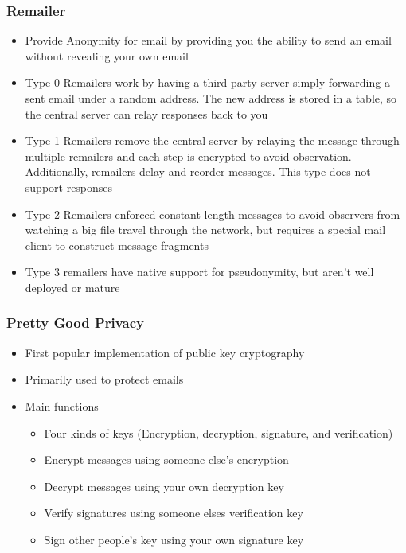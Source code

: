 \documentclass[twoside]{article}
\begin{document}
\subsubsection{Remailer}
\begin{itemize}
\item Provide Anonymity for email by providing you the ability to send an email without revealing your own email
\item Type 0 Remailers work by having a third party server simply forwarding a sent email under a random address. The new address is stored in a table, so the central server can relay responses back to you 
\item Type 1 Remailers remove the central server by relaying the message through multiple remailers and each step is encrypted to avoid observation. Additionally, remailers delay and reorder messages. This type does not support responses
\item Type 2 Remailers enforced constant length messages to avoid observers from watching a big file travel through the network, but requires a special mail client to construct message fragments
\item Type 3 remailers have native support for pseudonymity, but aren't well deployed or mature
\end{itemize}
\subsubsection{Pretty Good Privacy}
\begin{itemize}
\item First popular implementation of public key cryptography
\item Primarily used to protect emails 
\item Main functions
\begin{itemize}
\item Four kinds of keys (Encryption, decryption, signature, and verification)
\item Encrypt messages using someone else's encryption 
\item Decrypt messages using your own decryption key
\item Verify signatures using someone elses verification key 
\item Sign other people's key using your own signature key 
\end{itemize}
\end{itemize}
\end{document}
